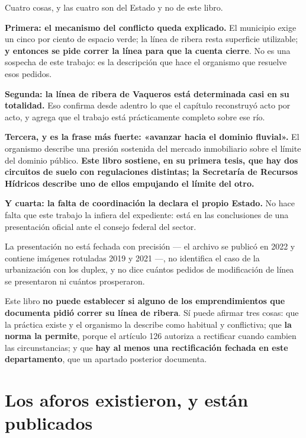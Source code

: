 Cuatro cosas, y las cuatro son del Estado y no de este libro.

\textbf{Primera: el mecanismo del conflicto queda explicado.} El municipio exige un cinco por
ciento de espacio verde; la línea de ribera resta superficie utilizable; \textbf{y entonces se
pide correr la línea para que la cuenta cierre}. No es una sospecha de este trabajo: es la
descripción que hace el organismo que resuelve esos pedidos.

\textbf{Segunda: la línea de ribera de Vaqueros está determinada casi en su totalidad.} Eso
confirma desde adentro lo que el capítulo reconstruyó acto por acto, y agrega que el trabajo
está prácticamente completo sobre ese río.

\textbf{Tercera, y es la frase más fuerte: «avanzar hacia el dominio fluvial».} El organismo
describe una presión sostenida del mercado inmobiliario sobre el límite del dominio público.
\textbf{Este libro sostiene, en su primera tesis, que hay dos circuitos de suelo con
regulaciones distintas; la Secretaría de Recursos Hídricos describe uno de ellos empujando el
límite del otro.}

\textbf{Y cuarta: la falta de coordinación la declara el propio Estado.} No hace falta que este
trabajo la infiera del expediente: está en las conclusiones de una presentación oficial ante
el consejo federal del sector.

\begin{cautela}
La presentación no está fechada con precisión --- el archivo se publicó en 2022 y contiene
imágenes rotuladas 2019 y 2021 ---, no identifica el caso de la urbanización con los duplex, y
no dice cuántos pedidos de modificación de línea se presentaron ni cuántos prosperaron.

Este libro \textbf{no puede establecer si alguno de los emprendimientos que documenta pidió
correr su línea de ribera}. Sí puede afirmar tres cosas: que la práctica existe y el organismo
la describe como habitual y conflictiva; que \textbf{la norma la permite}, porque el artículo
126 autoriza a rectificar cuando cambien las circunstancias; y que \textbf{hay al menos una
rectificación fechada en este departamento}, que un apartado posterior documenta.
\end{cautela}

\section{Los aforos existieron, y están publicados}

